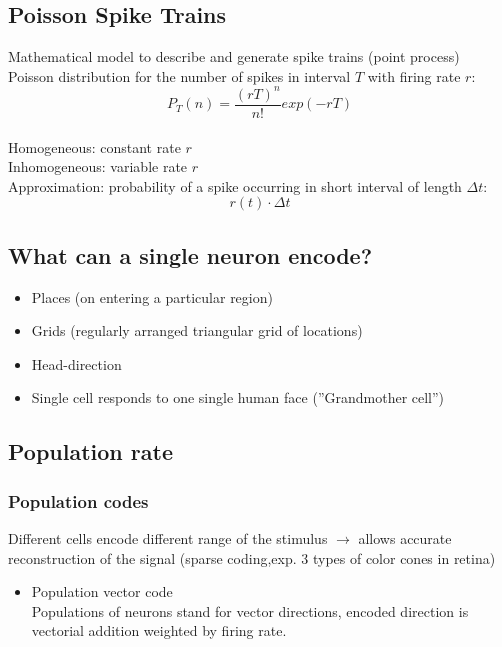 \documentclass[english,11pt]{article}
\begin{document}
\subsection{Poisson Spike Trains }
Mathematical model to describe and generate spike trains (point process)\\
Poisson distribution for the number of spikes in interval $T$ with firing rate $r$:\\
\begin{equation}
P_T (n) =  \frac{(rT)^n}{n!} exp(-rT)
\end{equation}\\
Homogeneous: constant rate $r$\\ 
Inhomogeneous: variable rate $r$\\
Approximation: probability of a spike occurring in short interval of length $\Delta t$: \\
\begin{equation} r(t)\cdot \Delta t \end{equation}


\subsection{What can a single neuron encode?}
\begin{itemize}
\item Places (on entering a particular region)
\item Grids (regularly arranged triangular grid of locations)
\item Head-direction
\item Single cell responds to one single human face (''Grandmother cell'')
\end{itemize}




\subsection{Population rate}

\subsubsection{Population codes}
Different cells encode different range of the stimulus $\rightarrow$ allows accurate reconstruction of the signal (sparse coding,exp. 3 types of color cones in retina)

\begin{itemize}
\item Population vector code\\
Populations of neurons stand for vector directions, encoded direction is vectorial addition weighted by firing rate.
\end{itemize}
\end{document}
